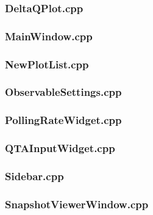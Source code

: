 \subsubsection*{DeltaQPlot.cpp}


\subsubsection*{MainWindow.cpp}


\subsubsection*{NewPlotList.cpp}


\subsubsection*{ObservableSettings.cpp}


\subsubsection*{PollingRateWidget.cpp}


\subsubsection*{QTAInputWidget.cpp}


\subsubsection*{Sidebar.cpp}


\subsubsection*{SnapshotViewerWindow.cpp}


